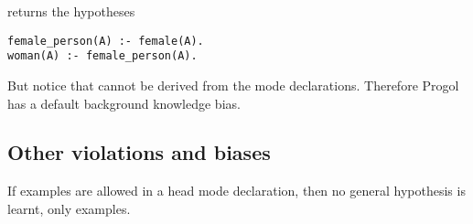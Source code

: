 returns the hypotheses
\begin{lstlisting}
female_person(A) :- female(A).
woman(A) :- female_person(A).
\end{lstlisting}
But notice that  cannot be derived from the mode declarations. Therefore Progol has a default background knowledge bias.

\subsection{Other violations and biases}
If examples are allowed in a head mode declaration, then no general hypothesis is learnt, only examples.
